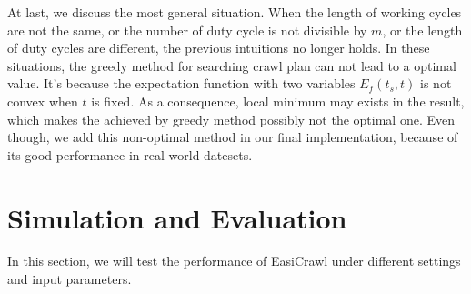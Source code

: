 \documentclass[conference]{IEEEtran}
\begin{document}
At last, we discuss the most general situation. 
When the length of working cycles are not the same, or the number of duty cycle is not divisible by $m$, or the length of duty cycles are different, the previous intuitions no longer holds.
In these situations, the greedy method for searching crawl plan can not lead to a optimal value. 
It's because the expectation function with two variables $E_f(t_s,t)$ is not convex when $t$ is fixed.
As a consequence, local minimum may exists in the result, which makes the achieved by greedy method possibly not the optimal one.
Even though, we add this non-optimal method in our final implementation, because of its good performance in real world datesets.

\section{Simulation and Evaluation} \label{simulation}

In this section, we will test the performance of EasiCrawl under different settings and input parameters. 
\end{document}
